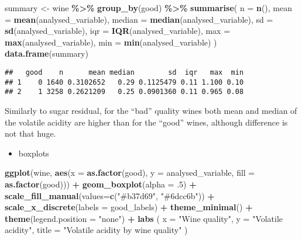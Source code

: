 \documentclass[
]{article}
\newenvironment{Shaded}{\begin{snugshade}}{\end{snugshade}}
\newcommand{\AttributeTok}[1]{\textcolor[rgb]{0.13,0.29,0.53}{#1}}
\newcommand{\DecValTok}[1]{\textcolor[rgb]{0.00,0.00,0.81}{#1}}
\newcommand{\FunctionTok}[1]{\textcolor[rgb]{0.13,0.29,0.53}{\textbf{#1}}}
\newcommand{\NormalTok}[1]{#1}
\newcommand{\OtherTok}[1]{\textcolor[rgb]{0.56,0.35,0.01}{#1}}
\newcommand{\SpecialCharTok}[1]{\textcolor[rgb]{0.81,0.36,0.00}{\textbf{#1}}}
\newcommand{\StringTok}[1]{\textcolor[rgb]{0.31,0.60,0.02}{#1}}
\providecommand{\tightlist}{%
  \setlength{\itemsep}{0pt}\setlength{\parskip}{0pt}}
\begin{document}
\begin{Shaded}
\begin{Highlighting}[]
\NormalTok{summary }\OtherTok{\textless{}{-}}\NormalTok{ wine }\SpecialCharTok{\%\textgreater{}\%}
  \FunctionTok{group\_by}\NormalTok{(good) }\SpecialCharTok{\%\textgreater{}\%}
  \FunctionTok{summarise}\NormalTok{(}
    \AttributeTok{n =} \FunctionTok{n}\NormalTok{(),}
    \AttributeTok{mean =} \FunctionTok{mean}\NormalTok{(analysed\_variable),}
    \AttributeTok{median =} \FunctionTok{median}\NormalTok{(analysed\_variable),}
    \AttributeTok{sd =} \FunctionTok{sd}\NormalTok{(analysed\_variable),}
    \AttributeTok{iqr =} \FunctionTok{IQR}\NormalTok{(analysed\_variable),}
    \AttributeTok{max =} \FunctionTok{max}\NormalTok{(analysed\_variable),}
    \AttributeTok{min =} \FunctionTok{min}\NormalTok{(analysed\_variable)}
\NormalTok{  )}
\FunctionTok{data.frame}\NormalTok{(summary)}
\end{Highlighting}
\end{Shaded}

\begin{verbatim}
##   good    n      mean median        sd  iqr   max  min
## 1    0 1640 0.3102652   0.29 0.1125479 0.11 1.100 0.10
## 2    1 3258 0.2621209   0.25 0.0901360 0.11 0.965 0.08
\end{verbatim}

Similarly to sugar residual, for the ``bad'' quality wines both mean and
median of the volatile acidity are higher than for the ``good'' wines,
although difference is not that huge.

\begin{itemize}
\tightlist
\item
  boxplots
\end{itemize}

\begin{Shaded}
\begin{Highlighting}[]
\FunctionTok{ggplot}\NormalTok{(wine, }\FunctionTok{aes}\NormalTok{(}\AttributeTok{x =} \FunctionTok{as.factor}\NormalTok{(good), }\AttributeTok{y =}\NormalTok{ analysed\_variable, }\AttributeTok{fill =} \FunctionTok{as.factor}\NormalTok{(good))) }\SpecialCharTok{+}
    \FunctionTok{geom\_boxplot}\NormalTok{(}\AttributeTok{alpha =}\NormalTok{ .}\DecValTok{5}\NormalTok{) }\SpecialCharTok{+}
    \FunctionTok{scale\_fill\_manual}\NormalTok{(}\AttributeTok{values=}\FunctionTok{c}\NormalTok{(}\StringTok{"\#b37d69"}\NormalTok{, }\StringTok{"\#6dcc6b"}\NormalTok{)) }\SpecialCharTok{+}
    \FunctionTok{scale\_x\_discrete}\NormalTok{(}\AttributeTok{labels =}\NormalTok{ good\_labels) }\SpecialCharTok{+}
    \FunctionTok{theme\_minimal}\NormalTok{() }\SpecialCharTok{+}
    \FunctionTok{theme}\NormalTok{(}\AttributeTok{legend.position =} \StringTok{"none"}\NormalTok{) }\SpecialCharTok{+}
    \FunctionTok{labs}\NormalTok{ (}
      \AttributeTok{x =} \StringTok{"Wine quality"}\NormalTok{,}
      \AttributeTok{y =} \StringTok{"Volatile acidity"}\NormalTok{,}
      \AttributeTok{title =} \StringTok{"Volatile acidity by wine quality"}
\NormalTok{    )}
\end{Highlighting}
\end{Shaded}
\end{document}
